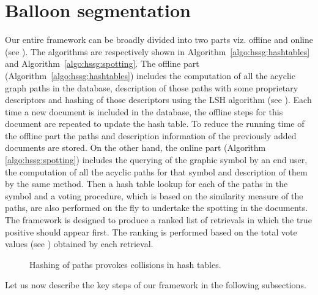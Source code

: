 \section{Balloon segmentation}
\label{ssec:hssg:frwrk}





Our entire framework can be broadly divided into two parts viz. offline and online (see ). The algorithms are respectively shown in Algorithm~\ref{algo:hssg:hashtables} and Algorithm~\ref{algo:hssg:spotting}. The offline part (Algorithm~\ref{algo:hssg:hashtables}) includes the computation of all the acyclic graph paths in the database, description of those paths with some proprietary descriptors and hashing of those descriptors using the LSH algorithm (see ). Each time a new document is included in the database, the offline steps for this document are repeated to update the hash table. To reduce the running time of the offline part the paths and description information of the previously added documents are stored. On the other hand, the online part (Algorithm \ref{algo:hssg:spotting}) includes the querying of the graphic symbol by an end user, the computation of all the acyclic paths for that symbol and description of them by the same method. Then a hash table lookup for each of the paths in the symbol and a voting procedure, which is based on the similarity measure of the paths, are also performed on the fly to undertake the spotting in the documents. The framework is designed to produce a ranked list of retrievals in which the true positive should appear first. The ranking is performed based on the total vote values (see ) obtained by each retrieval.

\begin{figure}[h!]
\centering {}
\caption{Hashing of paths provokes collisions in hash tables.}
\label{fig:hssg:pathlshim}
\end{figure}

Let us now describe the key steps of our framework in the following subsections.

